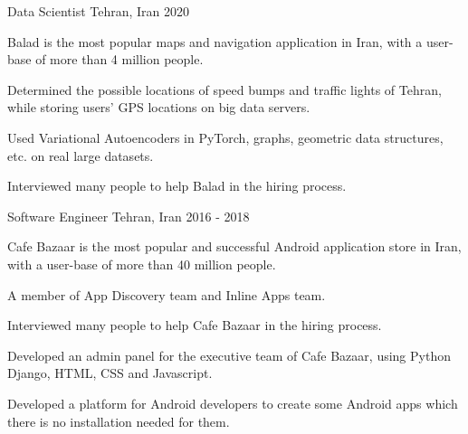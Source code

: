 

\begin{cventries}

 \cventry
    {} %
    {Data Scientist} %
    {Tehran, Iran} %
    {2020} %
    {
      \begin{cvitems} %
        \item {Balad is the most popular maps and navigation application in Iran, with a user-base of more than 4 million people.}
        \item {Determined the possible locations of speed bumps and traffic lights of Tehran, while storing users' GPS locations on big data servers.}
        \item {Used Variational Autoencoders in PyTorch, graphs, geometric data structures, etc. on real large datasets.}
        \item {Interviewed many people to help Balad in the hiring process.}
      \end{cvitems}
    }

  \cventry
    {} %
    {Software Engineer} %
    {Tehran, Iran} %
    {2016 - 2018} %
    {
      \begin{cvitems} %
        \item {Cafe Bazaar is the most popular and successful Android application store in Iran, with a user-base of more than 40 million people.}
        \item {A member of App Discovery team and Inline Apps team.}
        \item {Interviewed many people to help Cafe Bazaar in the hiring process.}
        \item {Developed an admin panel for the executive team of Cafe Bazaar, using Python Django, HTML, CSS and Javascript.}
        \item {Developed a platform for Android developers to create some Android apps which there is no installation needed for them.}
      \end{cvitems}
    }


\end{cventries}
